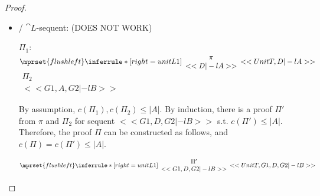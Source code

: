 \begin{proof}
\begin{enumerate}
\begin{itemize}
    \item \ElledruleSXXunitLOneName / $\cat{L}$-sequent: (DOES NOT WORK)
      \begin{center}
        \scriptsize
        $\Pi_1$:
        \begin{math}
          $$\mprset{flushleft}
          \inferrule* [right={\tiny unitL1}] {
            {
              \begin{array}{c}
                \pi \\
                {<<D |-l A>>}
              \end{array}
            }
          }{<<UnitT, D |-l A>>}
        \end{math}
        \qquad\qquad
        \begin{math}
          \begin{array}{c}
            \Pi_2 \\
            {<<G1, A, G2 |-l B>>}
          \end{array}
        \end{math}
      \end{center}
      By assumption, $c(\Pi_1),c(\Pi_2)\leq |A|$. By induction, there is a proof $\Pi'$ from
      $\pi$ and $\Pi_2$ for sequent $<<G1, D, G2 |-l B>>$ s.t. $c(\Pi')\leq |A|$. Therefore,
      the proof $\Pi$ can be constructed as follows, and $c(\Pi)=c(\Pi')\leq |A|$.
      \begin{center}
        \scriptsize
        \begin{math}
          $$\mprset{flushleft}
          \inferrule* [right={\tiny unitL1}] {
            {
              \begin{array}{c}
                \Pi' \\
                {<<G1, D, G2 |-l B>>}
              \end{array}
            }
          }{<<UnitT, G1, D, G2 |-l B>>}
        \end{math}
      \end{center}


\end{itemize}
\end{enumerate}
\end{proof}
